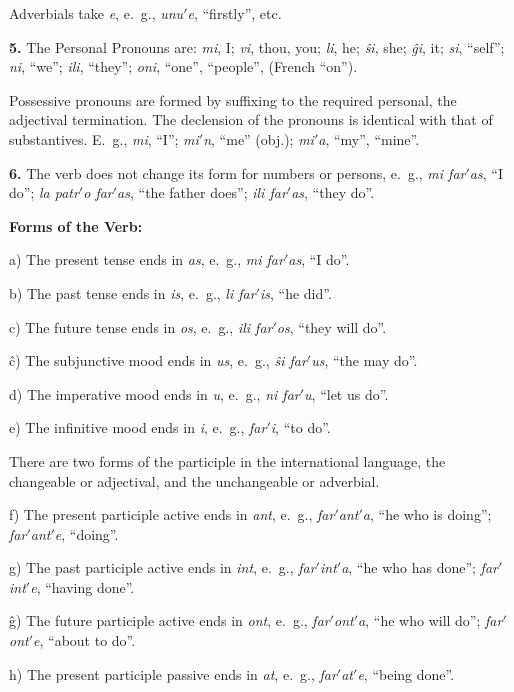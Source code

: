 Adverbials take \emph{e}, e.~g., \emph{unu$'$e}, “firstly”, etc.

\textbf{5.} The Personal Pronouns are: \emph{mi}, I; \emph{vi}, thou, you; \emph{li}, he; \emph{ŝi}, she; \emph{ĝi}, it; \emph{si}, “self”; \emph{ni}, “we”; \emph{ili}, “they”; \emph{oni}, “one”, “people”, (French “on”).

Possessive pronouns are formed by suffixing to the required personal, the adjectival termination. The declension of the pronouns is identical with that of substantives. E.~g., \emph{mi}, “I”; \emph{mi$'$n}, “me” (obj.); \emph{mi$'$a}, “my”, “mine”.

\textbf{6.} The verb does not change its form for numbers or persons, e.~g., \emph{mi far$'$as}, “I do”; \emph{la patr$'$o far$'$as}, “the father does”; \emph{ili far$'$as}, “they do”.

\begin{center}
\bf Forms of the Verb:
\end{center}

a) The present tense ends in \emph{as}, e.~g., \emph{mi far$'$as}, “I do”.

b) The past tense ends in \emph{is}, e.~g., \emph{li far$'$is}, “he did”.

c) The future tense ends in \emph{os}, e.~g., \emph{ili far$'$os}, “they will do”.

ĉ) The subjunctive mood ends in \emph{us}, e.~g., \emph{ŝi far$'$us}, “the may do”.

d) The imperative mood ends in \emph{u}, e.~g., \emph{ni far$'$u}, “let us do”.

e) The infinitive mood ends in \emph{i}, e.~g., \emph{far$'$i}, “to do”.

There are two forms of the participle in the international language, the changeable or adjectival, and the unchangeable or adverbial. 

f) The present participle active ends in \emph{ant}, e.~g., \emph{far$'$ant$'$a}, “he who is doing”; \emph{far$'$ant$'$e}, “doing”.

g) The past participle active ends in \emph{int}, e.~g., \emph{far$'$int$'$a}, “he who has done”; \emph{far$'$int$'$e}, “having done”.

ĝ) The future participle active ends in \emph{ont}, e.~g., \emph{far$'$ont$'$a}, “he who will do”; \emph{far$'$ont$'$e}, “about to do”.

h) The present participle passive ends in \emph{at}, e.~g., \emph{far$'$at$'$e}, “being done”.

